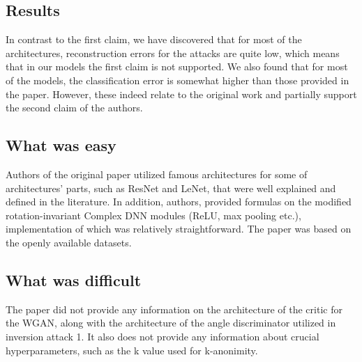 \subsection*{Results}
In contrast to the first claim, we have discovered that for most of the architectures, reconstruction errors for the attacks are quite low, which means that in our models the first claim is not supported. We also found that for most of the models, the classification error is somewhat higher than those provided in the paper. However, these indeed relate to the original work and partially support the second claim of the authors.


\subsection*{What was easy}
Authors of the original paper utilized famous architectures for some of architectures' parts, such as ResNet and LeNet, that were well explained and defined in the literature. In addition, authors, provided formulas on the modified rotation-invariant Complex DNN modules (ReLU, max pooling etc.), implementation of which was relatively straightforward. The paper was based on the openly available datasets. 

\subsection*{What was difficult}
The paper did not provide  any information on the architecture of the critic for the WGAN, along with the architecture of the angle discriminator utilized in inversion attack 1. It also does not  provide any information about crucial hyperparameters, such as the k value used for k-anonimity.



